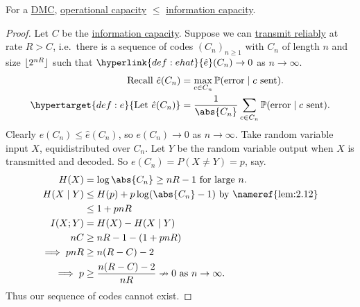 \documentclass{article}
\DeclarePairedDelimiter{\floor}{\lfloor}{\rfloor}
\newcommand{\Prob}{\mathbb{P}}
\newcommand{\1}[1]{\mathbbm{1}_{#1}}
\begin{document}
\begin{nprop}\label{prop:2.15}
    For a \hyperlink{def:dmc}{DMC}, \hyperlink{def:capacity}{operational capacity} $\leq$ \hyperlink{def:infoChannelCapacity}{information capacity}.
\end{nprop}
\begin{proof}
    Let $C$ be the \hyperlink{def:infoChannelCapacity}{information capacity}.
    Suppose we can \hyperlink{def:relTrans}{transmit reliably} at rate $R > C$, i.e.\ there is a sequence of codes $(C_n)_{n \geq 1}$ with $C_n$ of length $n$ and size $\floor{2^{nR}}$ such that $\hyperlink{def:ehat}{\hat{e}}(C_n) \to 0$ as $n \to \infty$.
    \begin{align*}
        \text{Recall } \hat{e}(C_n) &= \max_{c \in C_n} \Prob(\text{error} \mid c \text{ sent}). \\
        \hypertarget{def:e}{\text{Let } \hat{e}(C_n)} &= \frac{1}{\abs{C_n}} \sum_{c \in C_n} \Prob(\text{error} \mid c \text{ sent}).
    \end{align*}
    Clearly $e(C_n) \leq \hat{e}(C_n)$, so $e(C_n) \to 0$ as $n \to \infty$.
    Take random variable input $X$, equidistributed over $C_n$.
    Let $Y$ be the random variable output when $X$ is transmitted and decoded.
    So $e(C_n) = P(X \neq Y) = p$, say.
    \begin{align*}
        H(X) &= \log \abs{C_n} \geq n R - 1 \text{ for large } n. \\
        H(X \mid Y) &\leq H(p) + p \log(\abs{C_n} - 1) \text{ by \nameref{lem:2.12}} \\
                    &\leq 1 + pnR \\
        I(X;Y)&= H(X) - H(X \mid Y) \\
        n C &\geq n R - 1 - (1 + p n R) \\
        \implies p n R &\geq n(R-C) - 2 \\
        \implies p &\geq \frac{n(R-C) - 2}{nR} \nrightarrow 0 \text{ as } n \to \infty.
    \end{align*}
    Thus our sequence of codes cannot exist.
\end{proof}
\end{document}
